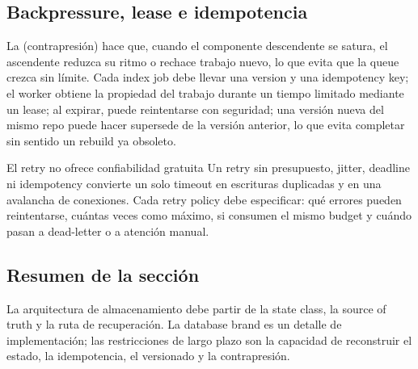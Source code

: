 \subsection{Backpressure, lease e idempotencia}

La  (contrapresión) hace que, cuando el componente descendente se satura, el ascendente reduzca su ritmo o rechace trabajo nuevo, lo que evita que la queue crezca sin límite. Cada index job debe llevar una version y una idempotency key; el worker obtiene la propiedad del trabajo durante un tiempo limitado mediante un lease; al expirar, puede reintentarse con seguridad; una versión nueva del mismo repo puede hacer supersede de la versión anterior, lo que evita completar sin sentido un rebuild ya obsoleto.

\begin{warningbox}{El retry no ofrece confiabilidad gratuita}
Un retry sin presupuesto, jitter, deadline ni idempotency convierte un solo timeout en escrituras duplicadas y en una avalancha de conexiones. Cada retry policy debe especificar: qué errores pueden reintentarse, cuántas veces como máximo, si consumen el mismo budget y cuándo pasan a dead-letter o a atención manual.
\end{warningbox}

\subsection{Resumen de la sección}

La arquitectura de almacenamiento debe partir de la state class, la source of truth y la ruta de recuperación. La database brand es un detalle de implementación; las restricciones de largo plazo son la capacidad de reconstruir el estado, la idempotencia, el versionado y la contrapresión.
